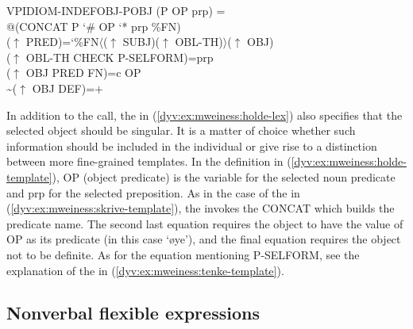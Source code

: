 \documentclass[output=paper]{langsci/langscibook}
\begin{document}

\ea\label{dyv:ex:mweiness:holde-template}
{\sffamily 
 VPIDIOM-INDEFOBJ-POBJ (P OP prp) =\\
\hspace{1.5em} @(CONCAT P `\# OP `* prp \%FN)\\
\hspace{1.5em}  ($\uparrow$  PRED)=`\%FN$\langle$($\uparrow$ SUBJ)($\uparrow$ OBL-TH)$\rangle$($\uparrow$ OBJ)\\
\hspace{1.5em} ($\uparrow$ OBL-TH CHECK P-SELFORM)=prp\\
\hspace{1.5em} ($\uparrow$ OBJ PRED FN)=c OP\\
\hspace{1.5em} {\textasciitilde}($\uparrow$ OBJ DEF)=+
}
\z

In addition to the  call, the  in   (\ref{dyv:ex:mweiness:holde-lex}) also specifies that the selected object should be singular.
It is a matter of choice whether such information should be included in the individual  or give rise to a distinction between more fine-grained templates.
In the  definition in (\ref{dyv:ex:mweiness:holde-template}), \textsf{OP} (object predicate) is the variable for the selected noun predicate and \textsf{prp} for the selected preposition.
As in the case of the  in (\ref{dyv:ex:mweiness:skrive-template}), the  invokes the \textsf{CONCAT}  which builds the predicate name.
The second last equation requires the object to have the value of \textsf{OP} as its predicate (in this case `øye'), and the final equation requires the object not to be definite.
As for the equation mentioning \textsf{P-SELFORM}, see the explanation of the  in (\ref{dyv:ex:mweiness:tenke-template}).

\subsection{Nonverbal flexible expressions}\label{dyv:sec:mweiness:nonverbal}
\end{document}
